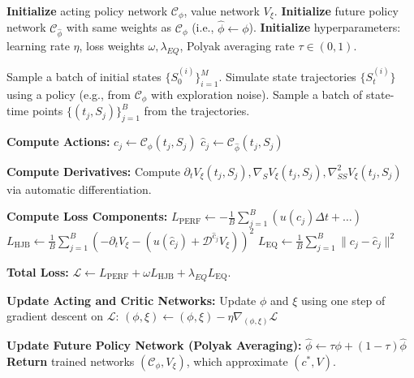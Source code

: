 \documentclass[ecta,draft]{econsocart}
\theoremstyle{plain}
\theoremstyle{remark}
\newcommand{\diffop}{\mathcal{D}}
\begin{document}
\begin{algorithm}[H]
\caption{NBO Algorithm for Sophisticated Time-Inconsistent Agents}
\label{alg:ti}
\begin{algorithmic}[1]
\State \textbf{Initialize} acting policy network $\mathcal{C}_{\phi}$, value network $V_{\xi}$.
\State \textbf{Initialize} future policy network $\mathcal{C}_{\hat{\phi}}$ with same weights as $\mathcal{C}_{\phi}$ (i.e., $\hat{\phi} \leftarrow \phi$).
\State \textbf{Initialize} hyperparameters: learning rate $\eta$, loss weights $\omega, \lambda_{EQ}$, Polyak averaging rate $\tau \in (0,1)$.

    \State Sample a batch of initial states $\{S_0^{(i)}\}_{i=1}^M$.
    \State Simulate state trajectories $\{S_t^{(i)}\}$ using a policy (e.g., from $\mathcal{C}_\phi$ with exploration noise).
    \State Sample a batch of state-time points $\{(t_j, S_j)\}_{j=1}^B$ from the trajectories.
    
    \State \textbf{Compute Actions:}
    \State $c_j \leftarrow \mathcal{C}_{\phi}(t_j, S_j)$
    \State $\hat{c}_j \leftarrow \mathcal{C}_{\hat{\phi}}(t_j, S_j)$
    
    \State \textbf{Compute Derivatives:}
    \State Compute $\partial_t V_\xi(t_j, S_j), \nabla_S V_\xi(t_j, S_j), \nabla_{SS}^2 V_\xi(t_j, S_j)$ via automatic differentiation.
    
    \State \textbf{Compute Loss Components:}
    \State $L_{\text{PERF}} \leftarrow -\frac{1}{B}\sum_{j=1}^B \left( u(c_j) \Delta t + \dots \right)$ 
    \State $L_{\text{HJB}} \leftarrow \frac{1}{B}\sum_{j=1}^B \left( -\partial_t V_\xi - \left( u(\hat{c}_j) + \diffop^{\hat{c}_j}V_\xi \right) \right)^2$
    \State $L_{\text{EQ}} \leftarrow \frac{1}{B}\sum_{j=1}^B \| c_j - \hat{c}_j \|^2$
    
    \State \textbf{Total Loss:} $\mathcal{L} \leftarrow L_{\text{PERF}} + \omega L_{\text{HJB}} + \lambda_{EQ} L_{\text{EQ}}$.
    
    \State \textbf{Update Acting and Critic Networks:}
    \State Update $\phi$ and $\xi$ using one step of gradient descent on $\mathcal{L}$:
    \State $(\phi, \xi) \leftarrow (\phi, \xi) - \eta \nabla_{(\phi, \xi)} \mathcal{L}$
    
    \State \textbf{Update Future Policy Network (Polyak Averaging):}
    \State $\hat{\phi} \leftarrow \tau \phi + (1-\tau) \hat{\phi}$
\EndFor
\State \textbf{Return} trained networks $(\mathcal{C}_{\phi}, V_{\xi})$, which approximate $(c^*, V)$.
\end{algorithmic}
\end{algorithm}
\end{document}

